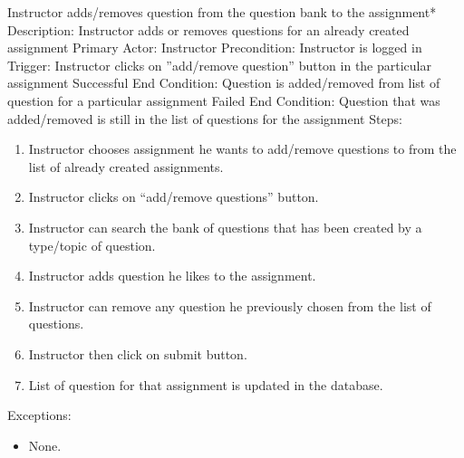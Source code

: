    \begin{section}{Instructor adds/removes question from the question bank to the assignment*}
		Description: Instructor adds or removes questions for an already created assignment \newline
		Primary Actor: Instructor \newline
		Precondition:  Instructor is logged in \newline
		Trigger: Instructor clicks on ''add/remove question'' button in the particular assignment \newline
		Successful End Condition: Question is added/removed from list of question for a particular assignment \newline
		Failed End Condition: Question that was added/removed is still in the list of questions for the assignment \newline
		\newline
        Steps:
        \begin{enumerate}
            \item{Instructor chooses assignment he wants to add/remove questions to from the list of already created assignments.}
            \item{Instructor clicks on “add/remove questions” button.}
            \item{Instructor can search the bank of questions that has been created by a type/topic of question.}
            \item{Instructor adds question he likes to the assignment.}
            \item{Instructor can remove any question he previously chosen from the list of questions.}
            \item{Instructor then click on submit button.}
			\item{List of question for that assignment is updated in the database.}
        \end{enumerate}
        Exceptions:
        \begin{itemize}
            \item{None.}
        \end{itemize}
    \end{section}
    
